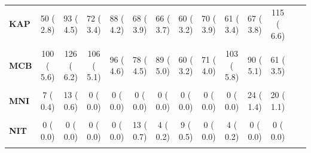 \documentclass[
]{article}
\begin{document}
\begin{table}[H]
\begin{tabular}[t]{>{\raggedright\arraybackslash}p{5em}ccccccccccccc}
\textbf{KAP} & 50 (  2.8) & 93 (  4.5) & 72 (  3.4) & 88 (  4.2) & 68 (  3.9) & 66 (  3.7) & 60 (  3.2) & 70 (  3.9) & 61 (  3.4) & 67 (  3.8) & 115 (  6.6) &  & \\
\textbf{\cellcolor{gray!10}{LAN}} & \cellcolor{gray!10}{68 (  3.8)} & \cellcolor{gray!10}{69 (  3.4)} & \cellcolor{gray!10}{79 (  3.8)} & \cellcolor{gray!10}{79 (  3.8)} & \cellcolor{gray!10}{85 (  4.9)} & \cellcolor{gray!10}{106 (  6.0)} & \cellcolor{gray!10}{73 (  3.9)} & \cellcolor{gray!10}{49 (  2.7)} & \cellcolor{gray!10}{44 (  2.5)} & \cellcolor{gray!10}{67 (  3.8)} & \cellcolor{gray!10}{47 (  2.7)} & \cellcolor{gray!10}{} & \cellcolor{gray!10}{}\\
\textbf{MCB} & 100 (  5.6) & 126 (  6.2) & 106 (  5.1) & 96 (  4.6) & 78 (  4.5) & 89 (  5.0) & 60 (  3.2) & 71 (  4.0) & 103 (  5.8) & 90 (  5.1) & 61 (  3.5) &  & \\
\textbf{\cellcolor{gray!10}{MIR}} & \cellcolor{gray!10}{89 (  5.0)} & \cellcolor{gray!10}{75 (  3.7)} & \cellcolor{gray!10}{70 (  3.3)} & \cellcolor{gray!10}{99 (  4.8)} & \cellcolor{gray!10}{75 (  4.3)} & \cellcolor{gray!10}{82 (  4.6)} & \cellcolor{gray!10}{95 (  5.0)} & \cellcolor{gray!10}{79 (  4.4)} & \cellcolor{gray!10}{71 (  4.0)} & \cellcolor{gray!10}{81 (  4.6)} & \cellcolor{gray!10}{105 (  6.0)} & \cellcolor{gray!10}{} & \cellcolor{gray!10}{}\\
\textbf{MNI} & 7 (  0.4) & 13 (  0.6) & 0 (  0.0) & 0 (  0.0) & 0 (  0.0) & 0 (  0.0) & 0 (  0.0) & 0 (  0.0) & 0 (  0.0) & 24 (  1.4) & 20 (  1.1) &  & \\
\textbf{\cellcolor{gray!10}{NAH}} & \cellcolor{gray!10}{84 (  4.7)} & \cellcolor{gray!10}{74 (  3.6)} & \cellcolor{gray!10}{111 (  5.3)} & \cellcolor{gray!10}{109 (  5.3)} & \cellcolor{gray!10}{77 (  4.4)} & \cellcolor{gray!10}{110 (  6.2)} & \cellcolor{gray!10}{104 (  5.5)} & \cellcolor{gray!10}{110 (  6.1)} & \cellcolor{gray!10}{107 (  6.0)} & \cellcolor{gray!10}{128 (  7.3)} & \cellcolor{gray!10}{106 (  6.0)} & \cellcolor{gray!10}{} & \cellcolor{gray!10}{}\\
\textbf{NIT} & 0 (  0.0) & 0 (  0.0) & 0 (  0.0) & 0 (  0.0) & 13 (  0.7) & 4 (  0.2) & 9 (  0.5) & 0 (  0.0) & 4 (  0.2) & 0 (  0.0) & 0 (  0.0) &  & \\
\textbf{\cellcolor{gray!10}{NZT}} & \cellcolor{gray!10}{28 (  1.6)} & \cellcolor{gray!10}{16 (  0.8)} & \cellcolor{gray!10}{24 (  1.1)} & \cellcolor{gray!10}{23 (  1.1)} & \cellcolor{gray!10}{28 (  1.6)} & \cellcolor{gray!10}{31 (  1.7)} & \cellcolor{gray!10}{32 (  1.7)} & \cellcolor{gray!10}{26 (  1.5)} & \cellcolor{gray!10}{30 (  1.7)} & \cellcolor{gray!10}{50 (  2.9)} & \cellcolor{gray!10}{70 (  4.0)} & \cellcolor{gray!10}{} & \cellcolor{gray!10}{}\\

\end{tabular}
\end{table}
\end{document}
